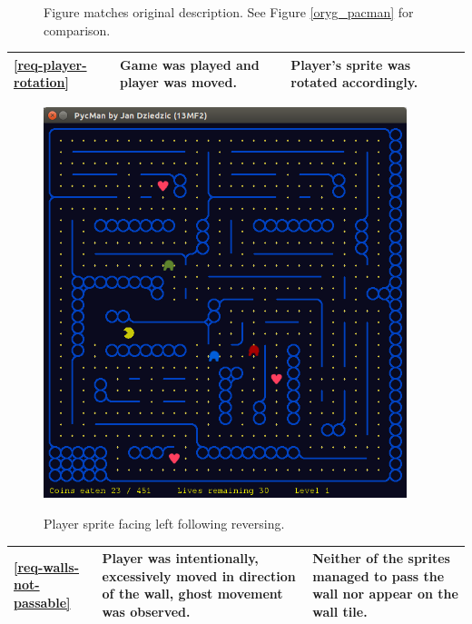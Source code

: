 \documentclass[11pt,a4paper,notitlepage]{report}
\newenvironment{img}{
	\begin{center}
		\begin{figure}[H]
			\begin{center}
			
}{
	\end{center}
		\end{figure}
			\end{center}
}
\begin{document}
\begin{center}
\begin{img}
					\caption{Figure matches original description. See Figure \ref{oryg_pacman} for comparison.}
				\end{img}
				\begin{longtable}{ | p{2cm} | p{5cm} | p{4cm} |}
					\hline	
					\ref{req-player-rotation}&Game was played and player was moved.&Player's sprite was rotated accordingly.\\ \hline
				\end{longtable}
				\begin{img}
					\includegraphics[width=300pt]{images/player_facing_left.png}\\
					\caption{Player sprite facing left following reversing.}
				\end{img}
				\begin{longtable}{ | p{2cm} | p{5cm} | p{4cm} |}
					\hline	
					\ref{req-walls-not-passable}&Player was intentionally, excessively moved in direction of the wall, ghost movement was observed.&Neither of the sprites managed to pass the wall nor appear on the wall tile. \\ \hline
				\end{longtable}
				\begin{img}

\end{img}
\end{center}
\end{document}
